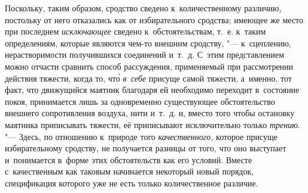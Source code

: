 Поскольку, таким образом, сродство сведено к~количественному различию,
постольку от него отказались как от избирательного сродства; имеющее же место
при последнем {\em исключающее} сведено к~обстоятельствам, т.~е. к~таким
определениям, которые являются чем-то внешним сродству, "--- к~сцеплению,
нерастворимости получившихся соединений и~т.~д. С~этим представлением можно
отчасти сравнить способ рассуждения, применяемый при рассмотрении действия
тяжести, когда то, чт\'{о} {\em в~себе} присуще самой тяжести, а~именно, тот
факт, что движущийся маятник благодаря ей необходимо переходит в~состояние
покоя, принимается лишь за одновременно существующее обстоятельство внешнего
сопротивления воздуха, нити и~т.~д. и, вместо того чтобы остановку маятника
приписывать тяжести, её приписывают исключительно только
{\em трению}. "--- Здесь, по отношению к~природе того
{\em качественного,} которое присуще избирательному сродству, не получается
разницы от того, что оно выступает и~понимается в~форме этих обстоятельств как
его условий. Вместе с~качественным как таковым начинается некоторый новый
порядок, спецификация которого уже не есть только количественное различие.

